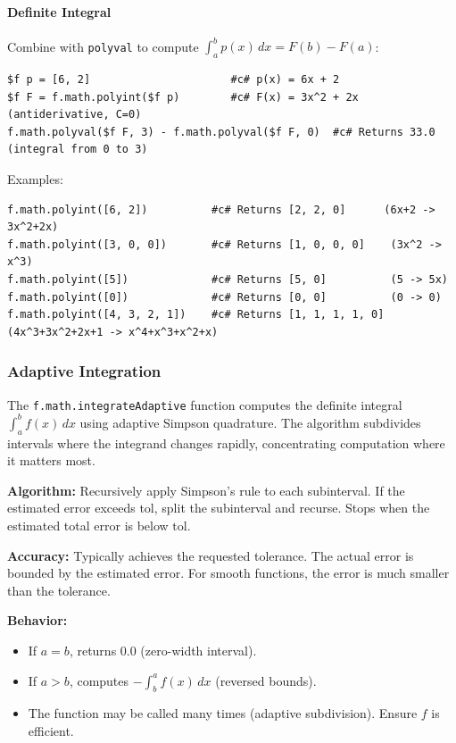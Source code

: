 \paragraph{Definite Integral} Combine with \texttt{polyval} to compute $\int_a^b p(x)\,dx = F(b) - F(a)$:
\begin{verbatim}
$f p = [6, 2]                      #c# p(x) = 6x + 2
$f F = f.math.polyint($f p)        #c# F(x) = 3x^2 + 2x  (antiderivative, C=0)
f.math.polyval($f F, 3) - f.math.polyval($f F, 0)  #c# Returns 33.0  (integral from 0 to 3)
\end{verbatim}
Examples:
\begin{verbatim}
f.math.polyint([6, 2])          #c# Returns [2, 2, 0]      (6x+2 -> 3x^2+2x)
f.math.polyint([3, 0, 0])       #c# Returns [1, 0, 0, 0]    (3x^2 -> x^3)
f.math.polyint([5])             #c# Returns [5, 0]          (5 -> 5x)
f.math.polyint([0])             #c# Returns [0, 0]          (0 -> 0)
f.math.polyint([4, 3, 2, 1])    #c# Returns [1, 1, 1, 1, 0]  (4x^3+3x^2+2x+1 -> x^4+x^3+x^2+x)
\end{verbatim}

\subsubsection{Adaptive Integration}
The \texttt{f.math.integrateAdaptive} function computes the definite integral $\int_a^b f(x)\,dx$ using adaptive Simpson quadrature. The algorithm subdivides intervals where the integrand changes rapidly, concentrating computation where it matters most.

\textbf{Algorithm:} Recursively apply Simpson's rule to each subinterval. If the estimated error exceeds $\text{tol}$, split the subinterval and recurse. Stops when the estimated total error is below $\text{tol}$.

\textbf{Accuracy:} Typically achieves the requested tolerance. The actual error is bounded by the estimated error. For smooth functions, the error is much smaller than the tolerance.

\textbf{Behavior:}
\begin{itemize}
\item If $a = b$, returns 0.0 (zero-width interval).
\item If $a > b$, computes $-\int_b^a f(x)\,dx$ (reversed bounds).
\item The function may be called many times (adaptive subdivision). Ensure $f$ is efficient.
\end{itemize}

